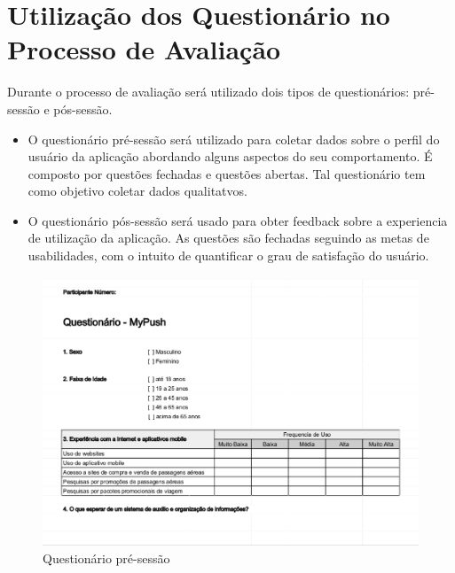 \nocite{FILARDI_TRAINA_2008}

\section{Utilização dos Questionário no Processo de Avaliação}

Durante o processo de avaliação será utilizado dois tipos de questionários: pré-sessão e pós-sessão.
\begin{itemize}
	\item O questionário pré-sessão será utilizado para coletar dados sobre o perfil do usuário da aplicação abordando alguns aspectos do seu comportamento. É composto por questões fechadas e questões abertas. Tal questionário tem como objetivo coletar dados qualitatvos.
	\item O questionário pós-sessão será usado para obter feedback sobre a experiencia de utilização da aplicação. As questões são fechadas seguindo as metas de usabilidades, com o intuito de quantificar o grau de satisfação do usuário.
\end{itemize}

\begin{figure}[h]
	\centering
	\includegraphics[scale=0.5]{figuras/questionario_pre-sessao.eps}
	\caption{Questionário pré-sessão}
\end{figure}

